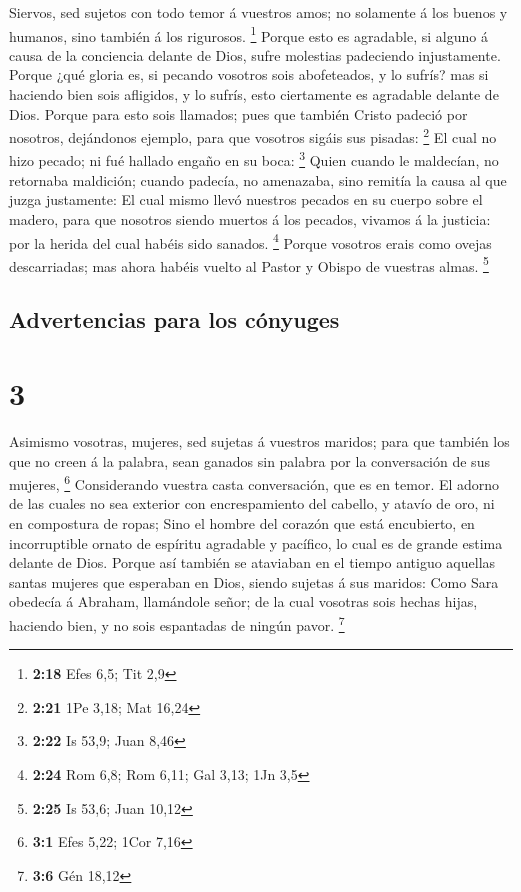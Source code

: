  Siervos, sed sujetos con todo temor á vuestros amos; no
solamente á los buenos y humanos, sino también á los rigurosos.
\footnote{\textbf{2:18} Efes 6,5; Tit 2,9}  Porque esto es
agradable, si alguno á causa de la conciencia delante de Dios, sufre
molestias padeciendo injustamente.  Porque ¿qué gloria es,
si pecando vosotros sois abofeteados, y lo sufrís? mas si haciendo bien
sois afligidos, y lo sufrís, esto ciertamente es agradable delante de
Dios.  Porque para esto sois llamados; pues que también
Cristo padeció por nosotros, dejándonos ejemplo, para que vosotros
sigáis sus pisadas: \footnote{\textbf{2:21} 1Pe 3,18; Mat 16,24}
 El cual no hizo pecado; ni fué hallado engaño en su boca:
\footnote{\textbf{2:22} Is 53,9; Juan 8,46}  Quien cuando
le maldecían, no retornaba maldición; cuando padecía, no amenazaba, sino
remitía la causa al que juzga justamente:  El cual mismo
llevó nuestros pecados en su cuerpo sobre el madero, para que nosotros
siendo muertos á los pecados, vivamos á la justicia: por la herida del
cual habéis sido sanados. \footnote{\textbf{2:24} Rom 6,8; Rom 6,11; Gal
  3,13; 1Jn 3,5}  Porque vosotros erais como ovejas
descarriadas; mas ahora habéis vuelto al Pastor y Obispo de vuestras
almas. \footnote{\textbf{2:25} Is 53,6; Juan 10,12}

\hypertarget{advertencias-para-los-cuxf3nyuges}{%
\subsection{Advertencias para los
cónyuges}\label{advertencias-para-los-cuxf3nyuges}}

\hypertarget{section-2}{%
\section{3}\label{section-2}}

 Asimismo vosotras, mujeres, sed sujetas á vuestros maridos;
para que también los que no creen á la palabra, sean ganados sin palabra
por la conversación de sus mujeres, \footnote{\textbf{3:1} Efes 5,22;
  1Cor 7,16}  Considerando vuestra casta conversación, que
es en temor.  El adorno de las cuales no sea exterior con
encrespamiento del cabello, y atavío de oro, ni en compostura de ropas;
 Sino el hombre del corazón que está encubierto, en
incorruptible ornato de espíritu agradable y pacífico, lo cual es de
grande estima delante de Dios.  Porque así también se
ataviaban en el tiempo antiguo aquellas santas mujeres que esperaban en
Dios, siendo sujetas á sus maridos:  Como Sara obedecía á
Abraham, llamándole señor; de la cual vosotras sois hechas hijas,
haciendo bien, y no sois espantadas de ningún pavor. \footnote{\textbf{3:6}
  Gén 18,12}

